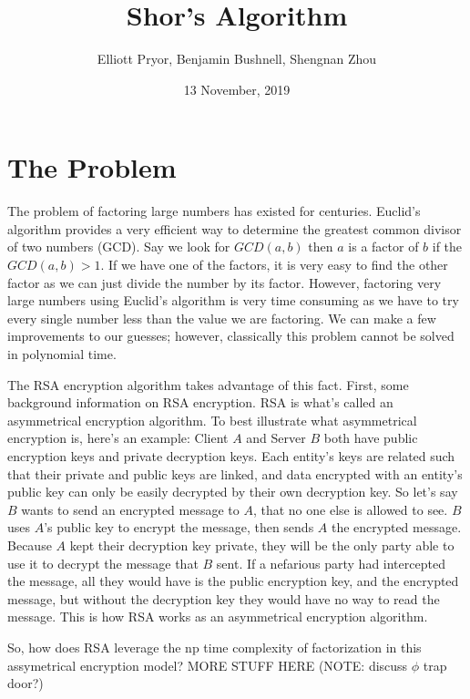 \documentclass[a4paper]{article}
\title{Shor's Algorithm}
\author{Elliott Pryor, Benjamin Bushnell, Shengnan Zhou}
\date{13 November, 2019}
\begin{document}
\maketitle %
\section{The Problem}
The problem of factoring large numbers has existed for centuries. Euclid's algorithm provides a very efficient way to determine the greatest common divisor of two numbers (GCD). Say we look for $GCD(a,b)$ then $a$ is a factor of $b$ if the $GCD(a, b) > 1$. If we have one of the factors, it is very easy to find the other factor as we can just divide the number by its factor. However, factoring very large numbers using Euclid's algorithm is very time consuming as we have to try every single number less than the value we are factoring. We can make a few improvements to our guesses; however, classically this problem cannot be solved in polynomial time.

The RSA encryption algorithm takes advantage of this fact. First, some background information on RSA encryption. RSA is what's called an asymmetrical encryption algorithm. To best illustrate what asymmetrical encryption is, here's an example: Client $A$ and Server $B$ both have public encryption keys and private decryption keys. Each entity's keys are related such that their private and public keys are linked, and data encrypted with an entity's public key can only be easily decrypted by their own decryption key. So let's say $B$ wants to send an encrypted message to $A$, that no one else is allowed to see. $B$ uses $A$'s public key to encrypt the message, then sends $A$ the encrypted message. Because $A$ kept their decryption key private, they will be the only party able to use it to decrypt the message that $B$ sent. If a nefarious party had intercepted the message, all they would have is the public encryption key, and the encrypted message, but without the decryption key they would have no way to read the message. This is how RSA works as an asymmetrical encryption algorithm.

So, how does RSA leverage the np time complexity of factorization in this assymetrical encryption model? MORE STUFF HERE (NOTE: discuss $\phi$ trap door?)
\end{document}
